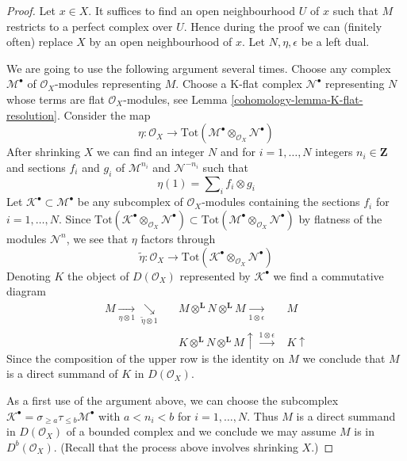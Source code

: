 \begin{proof}

Let $x \in X$. It suffices to find an open neighbourhood $U$ of $x$
such that $M$ restricts to a perfect complex over $U$. Hence during the
proof we can (finitely often) replace $X$ by an open neighbourhood of $x$.
Let $N, \eta, \epsilon$ be a left dual.

\medskip\noindent
We are going to use the following argument several times. Choose any
complex $\mathcal{M}^\bullet$
of $\mathcal{O}_X$-modules representing $M$. Choose a K-flat complex
$\mathcal{N}^\bullet$ representing $N$ whose terms are flat
$\mathcal{O}_X$-modules, see Lemma \ref{cohomology-lemma-K-flat-resolution}.
Consider the map
$$
\eta : \mathcal{O}_X \to
\text{Tot}(\mathcal{M}^\bullet \otimes_{\mathcal{O}_X} \mathcal{N}^\bullet)
$$
After shrinking $X$ we can find an integer $N$ and for
$i = 1, \ldots, N$ integers $n_i \in \mathbf{Z}$ and sections
$f_i$ and $g_i$ of $\mathcal{M}^{n_i}$ and $\mathcal{N}^{-n_i}$
such that
$$
\eta(1) = \sum\nolimits_i f_i \otimes g_i
$$
Let $\mathcal{K}^\bullet \subset \mathcal{M}^\bullet$ be any subcomplex
of $\mathcal{O}_X$-modules containing the sections $f_i$
for $i = 1, \ldots, N$.
Since
$\text{Tot}(\mathcal{K}^\bullet \otimes_{\mathcal{O}_X} \mathcal{N}^\bullet)
\subset
\text{Tot}(\mathcal{M}^\bullet \otimes_{\mathcal{O}_X} \mathcal{N}^\bullet)$
by flatness of the modules $\mathcal{N}^n$, we see that $\eta$ factors through
$$
\tilde \eta :
\mathcal{O}_X \to
\text{Tot}(\mathcal{K}^\bullet \otimes_{\mathcal{O}_X} \mathcal{N}^\bullet)
$$
Denoting $K$ the object of $D(\mathcal{O}_X)$ represented by
$\mathcal{K}^\bullet$ we find a commutative diagram
$$
\begin{array}{cccc}M \underset{\eta \otimes 1}{\longrightarrow}\underset{\tilde \eta \otimes 1}{\searrow} &  & M \otimes^\mathbf{L} N \otimes^\mathbf{L} M
\underset{1 \otimes \epsilon}{\longrightarrow} & M \\  &  & K \otimes^\mathbf{L} N \otimes^\mathbf{L} M
\uparrow\overset{1 \otimes \epsilon}{\longrightarrow} & K \uparrow\end{array}
$$
Since the composition of the upper row is the identity on $M$
we conclude that $M$ is a direct summand of $K$ in $D(\mathcal{O}_X)$.

\medskip\noindent
As a first use of the argument above, we can choose the subcomplex
$\mathcal{K}^\bullet = \sigma_{\geq a} \tau_{\leq b}\mathcal{M}^\bullet$
with $a < n_i < b$ for $i = 1, \ldots, N$. Thus $M$ is a direct
summand in $D(\mathcal{O}_X)$ of a bounded complex and we conclude
we may assume $M$ is in $D^b(\mathcal{O}_X)$. (Recall that the process
above involves shrinking $X$.)


\end{proof}
